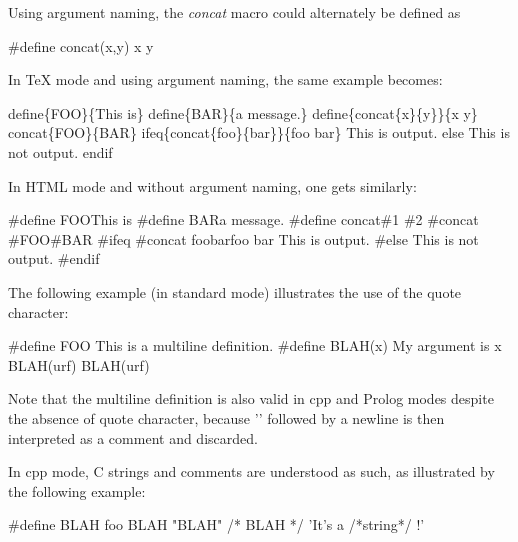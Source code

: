 Using argument naming, the {\it concat} macro could alternately be defined as 

\begin{PRE}
  \#define concat(x,y) x y
\end{PRE}

In TeX mode and using argument naming, the same example becomes: 

\begin{PRE}
  {\htmlBackslash}define\{FOO\}\{This is\}
  {\htmlBackslash}define\{BAR\}\{a message.\}
  {\htmlBackslash}define\{{\htmlBackslash}concat\{x\}\{y\}\}\{{\htmlBackslash}x {\htmlBackslash}y\}
  {\htmlBackslash}concat\{{\htmlBackslash}FOO\}\{{\htmlBackslash}BAR\}
  {\htmlBackslash}ifeq\{{\htmlBackslash}concat\{foo\}\{bar\}\}\{foo bar\}
  This is output.
  {\htmlBackslash}else
  This is not output.
  {\htmlBackslash}endif
\end{PRE}

In HTML mode and without argument naming, one gets similarly: 

\begin{PRE}
  {\htmlLt}\#define FOO{\htmlBar}This is{\htmlGt}
  {\htmlLt}\#define BAR{\htmlBar}a message.{\htmlGt}
  {\htmlLt}\#define concat{\htmlBar}\#1 \#2{\htmlGt}
  {\htmlLt}\#concat {\htmlLt}\#FOO{\htmlGt}{\htmlBar}{\htmlLt}\#BAR{\htmlGt}{\htmlGt}
  {\htmlLt}\#ifeq {\htmlLt}\#concat foo{\htmlBar}bar{\htmlGt}{\htmlBar}foo bar{\htmlGt}
  This is output.
  {\htmlLt}\#else{\htmlGt}
  This is not output.
  {\htmlLt}\#endif{\htmlGt}
\end{PRE}

The following example (in standard mode) illustrates the use of the quote
character: 

\begin{PRE}
  \#define FOO This is {\htmlBackslash}
     a multiline definition.
  \#define BLAH(x) My argument is x
  BLAH(urf)
  {\htmlBackslash}BLAH(urf)
\end{PRE}

Note that the multiline definition is also valid in cpp and Prolog modes
despite the absence of quote character, because '{\htmlBackslash}' followed by
a newline is then interpreted as a comment and discarded. 

In cpp mode, C strings and comments are understood as such, as illustrated by
the following example: 

\begin{PRE}
  \#define BLAH foo
  BLAH "BLAH" /* BLAH */
  'It{\htmlBackslash}'s a /*string*/ !'
\end{PRE}


